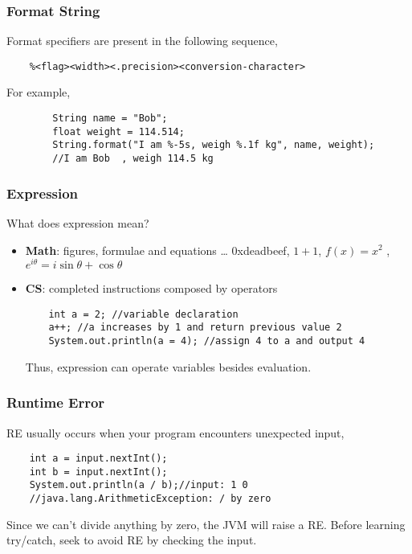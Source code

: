 \documentclass{beamer}
\begin{document}
\begin{frame}[fragile]
    \frametitle{Format String}
    Format specifiers are present in the following sequence,
    \begin{lstlisting}
    %<flag><width><.precision><conversion-character>
    \end{lstlisting}
    For example,
    \begin{lstlisting}
        String name = "Bob";
        float weight = 114.514;
        String.format("I am %-5s, weigh %.1f kg", name, weight);
        //I am Bob  , weigh 114.5 kg
    \end{lstlisting}
\end{frame}

\begin{frame}[fragile]
    \frametitle{Expression}
    What does expression mean?
    \begin{itemize}
        \item \textbf{Math}: figures, formulae and equations \dots \newline
        0xdeadbeef, $1+1$, $f(x) = x^2$ , $e^{i\theta} = i\sin\theta + \cos\theta$
        \item \textbf{CS}: completed instructions composed by operators
        \begin{lstlisting}
    int a = 2; //variable declaration
    a++; //a increases by 1 and return previous value 2
    System.out.println(a = 4); //assign 4 to a and output 4
        \end{lstlisting}
        Thus, expression can operate variables besides evaluation.
    \end{itemize}
\end{frame}

\begin{frame}[fragile]
    \frametitle{Runtime Error}
    RE usually occurs when your program encounters unexpected input,
    \begin{lstlisting}
    int a = input.nextInt();
    int b = input.nextInt();
    System.out.println(a / b);//input: 1 0
    //java.lang.ArithmeticException: / by zero
    \end{lstlisting}
    Since we can't divide anything by zero, the JVM will raise a RE.\newline\newline
    Before learning try/catch, seek to avoid RE by checking the input.
\end{frame}
\end{document}
